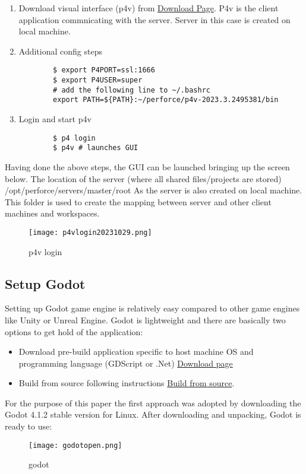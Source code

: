 \begin{enumerate}
\begin{verbatim}
    \end{verbatim}
    \item Download visual interface (p4v) from 
    \href{https://www.perforce.com/downloads/helix-visual-client-p4v}{\color{blue} Download Page}.
    P4v is the client application commnicating with the server. Server in this case is created on local machine.
    \item Additional config steps
    \begin{verbatim}
        $ export P4PORT=ssl:1666
        $ export P4USER=super
        # add the following line to ~/.bashrc
        export PATH=${PATH}:~/perforce/p4v-2023.3.2495381/bin
    \end{verbatim}
    \item Login and start p4v
    \begin{verbatim}
        $ p4 login
        $ p4v # launches GUI
    \end{verbatim}
\end{enumerate}
Having done the above steps, the GUI can be launched bringing up the screen below. The location of the server (where
all shared files/projects are stored) \colorbox{blue!30}{/opt/perforce/servers/master/root} 
As the server is also created on local machine. This folder is used to create the mapping between server and other 
client machines and workspaces.
\begin{figure}[H]
    \centering
    \texttt{[image: p4vlogin20231029.png]}
      \caption{p4v login}
      \label{fig:p4v login}
\end{figure}

\subsection{Setup Godot}
Setting up Godot game engine is relatively easy compared to other game engines like Unity\textsuperscript{\texttrademark}
or Unreal Engine\textsuperscript{\texttrademark}. Godot is lightweight and there are basically two options to get hold
of the application:
\begin{itemize}
    \item Download pre-build application specific to host machine OS and programming language (GDScript or .Net)
    \href{https://godotengine.org/download/linux/}{\color{blue}Download page}
    \item Build from source following instructions 
    \href{https://docs.godotengine.org/en/stable/contributing/development/compiling/index.html}{\color{blue}Build from source}.
\end{itemize}
For the purpose of this paper the first approach was adopted by downloading the Godot 4.1.2 stable version for Linux.
After downloading and unpacking, Godot is ready to use:
\begin{figure}[H]
    \centering
    \texttt{[image: godotopen.png]}
      \caption{godot}
      \label{fig:godot}
\end{figure}

